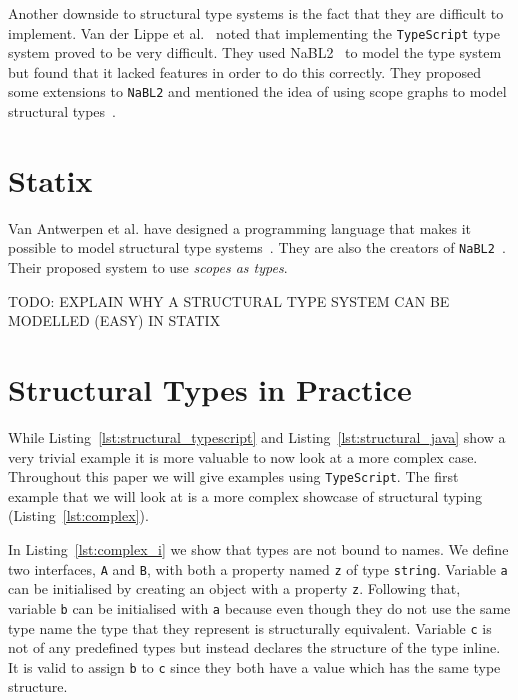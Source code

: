 \documentclass{article}
\newcommand{\ttt}[1]{\texttt{#1}}
\begin{document}
Another downside to structural type systems is the fact that they are difficult to implement.
Van der Lippe et al.~\cite{MetaTypeScript} noted that implementing the \ttt{TypeScript} type system proved to be very difficult.
They used NaBL2~\cite{nabl2} to model the type system but found that it lacked features in order to do this correctly.
They proposed some extensions to \ttt{NaBL2} and mentioned the idea of using scope graphs to model structural types~\cite{MetaTypeScript}.

\section*{Statix}
Van Antwerpen et al. have designed a programming language that makes it possible to model structural type systems~\cite{Statix}.
They are also the creators of \ttt{NaBL2}~\cite{nabl2}.
Their proposed system to use \textit{scopes as types}.

TODO: EXPLAIN WHY A STRUCTURAL TYPE SYSTEM CAN BE MODELLED (EASY) IN STATIX

\section*{Structural Types in Practice}
While Listing~\ref{lst:structural_typescript} and Listing~\ref{lst:structural_java} show a very trivial example it is more valuable to now look at a more complex case.
Throughout this paper we will give examples using \ttt{TypeScript}.
The first example that we will look at is a more complex showcase of structural typing (Listing~\ref{lst:complex}).
\noindent
\begin{center}
    \begin{minipage}{.60\textwidth}
    
    \end{minipage}
\end{center}
In Listing~\ref{lst:complex_i} we show that types are not bound to names.
We define two interfaces, \ttt{A} and \ttt{B}, with both a property named \ttt{z} of type \ttt{string}.
Variable \ttt{a} can be initialised by creating an object with a property \ttt{z}.
Following that, variable \ttt{b} can be initialised with \ttt{a} because even though they do not use the same type name the type that they represent is structurally equivalent.
Variable \ttt{c} is not of any predefined types but instead declares the structure of the type inline.
It is valid to assign \ttt{b} to \ttt{c} since they both have a value which has the same type structure.
\end{document}
